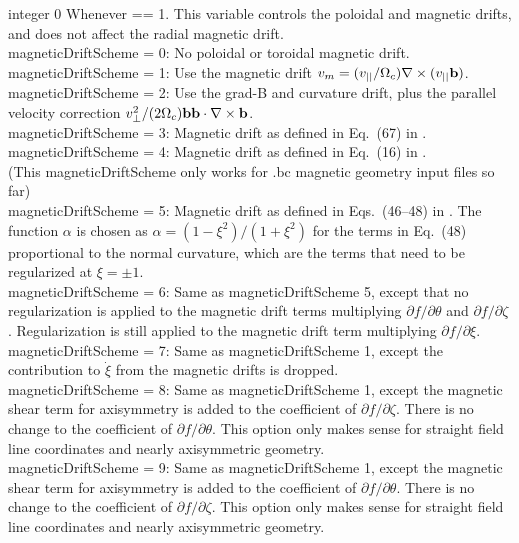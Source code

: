 {integer}
{0}
{Whenever  == 1.}
{This variable controls the poloidal and magnetic drifts, and does not affect the radial magnetic drift.\\

{\ttfamily magneticDriftScheme} = 0: No poloidal or toroidal magnetic drift.\\

{\ttfamily magneticDriftScheme} = 1: Use the magnetic drift $v_m = (v_{||} / \Omega_c) \nabla \times (v_{||} {\mathbf b})$.\\

{\ttfamily magneticDriftScheme} = 2: Use the grad-B and curvature
drift, plus the parallel velocity correction $v_{\perp}^2/(2 \Omega_c)
{\mathbf b} {\mathbf b} \cdot \nabla \times {\mathbf b}$.\\

{\ttfamily magneticDriftScheme} = 3: Magnetic drift as defined in
Eq.~(67) in \cite{Kasilov2014}.\\

{\ttfamily magneticDriftScheme} = 4: Magnetic drift as defined in
Eq.~(16) in \cite{Martitsch2016}.\\ (This {\ttfamily
  magneticDriftScheme} only works for .bc magnetic
geometry input files so far)\\

{\ttfamily magneticDriftScheme} = 5: Magnetic drift as defined in
Eqs.~(46--48) in \cite{Sugama2016}. The function $\alpha$
 is chosen as $\alpha=(1-\xi^2)/(1+\xi^2)$ for the terms
in Eq.~(48) proportional to the normal curvature, which are the terms
that need
to be regularized at $\xi=\pm 1$.\\

{\ttfamily magneticDriftScheme} = 6: Same as {\ttfamily magneticDriftScheme} 5,
except that no regularization is applied to the magnetic drift terms multiplying $\partial f/\partial \theta$
and $\partial f/\partial\zeta$. Regularization is still applied to the magnetic drift term multiplying $\partial f/\partial \xi$.\\

{\ttfamily magneticDriftScheme} = 7: Same as {\ttfamily magneticDriftScheme} 1,
except the contribution to $\dot{\xi}$ from the magnetic drifts is dropped.\\

{\ttfamily magneticDriftScheme} = 8: Same as {\ttfamily magneticDriftScheme} 1,
except the magnetic shear term for axisymmetry is added to the coefficient of $\partial f/\partial \zeta$.
There is no change to the coefficient of $\partial f/\partial\theta.$ This option only makes sense for straight field line coordinates
and nearly axisymmetric geometry.\\

{\ttfamily magneticDriftScheme} = 9: Same as {\ttfamily magneticDriftScheme} 1,
except the magnetic shear term for axisymmetry is added to the coefficient of $\partial f/\partial \theta$.
There is no change to the coefficient of $\partial f/\partial\zeta.$ This option only makes sense for straight field line coordinates
and nearly axisymmetric geometry.\\


}

